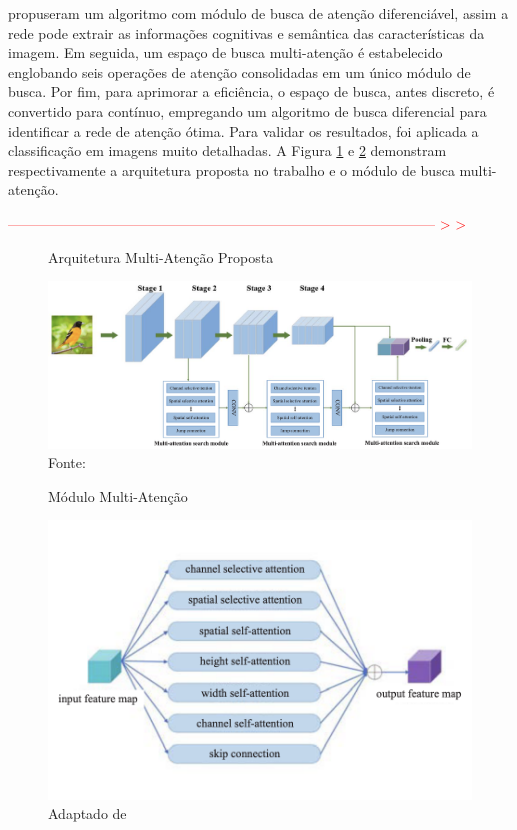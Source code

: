  propuseram um algoritmo com módulo de busca de atenção diferenciável, assim a rede pode extrair as informações cognitivas e semântica das características da imagem. Em seguida, um espaço de busca multi-atenção é estabelecido englobando seis operações de atenção consolidadas em um único módulo de busca. Por fim, para aprimorar a eficiência, o espaço de busca, antes discreto, é convertido para contínuo, empregando um algoritmo de busca diferencial para identificar a rede de atenção ótima. Para validar os resultados, foi aplicada a classificação em imagens  muito detalhadas. A Figura \ref{fig:fig022} e \ref{fig:fig023} demonstram respectivamente a arquitetura proposta no trabalho e o módulo de busca multi-atenção.
\newline

\textcolor{red}{
-------------------------------------------------------------------------------------------- > >
}

\begin{figure}[htbp]
    \centering
    \caption{Arquitetura Multi-Atenção Proposta}
    \includegraphics[width=1\textwidth]{figures/fig022.png}
    \caption*{Fonte: \cite{yangNeuralNetworkDesign2024a}}
    \label{fig:fig022}
\end{figure}

\begin{figure}[htbp]
    \centering
    \caption{Módulo Multi-Atenção}
    \includegraphics[width=1\textwidth]{figures/fig023.png}
    \caption*{Adaptado de \cite{yangNeuralNetworkDesign2024a}}
    \label{fig:fig023}
\end{figure}
